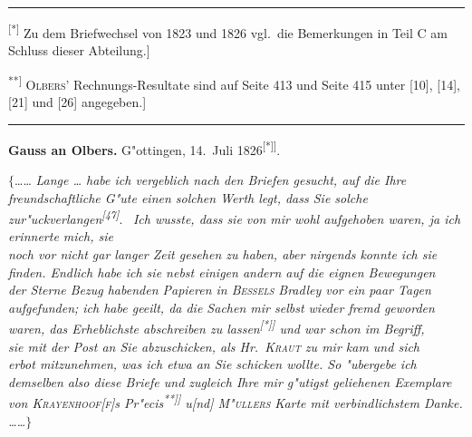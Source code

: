 \documentclass[12pt,a4paper]{article}
\theoremstyle{plain}
\theoremstyle{definition}
\theoremstyle{remark}
\begin{document}
\rule{\textwidth}{0.4pt}
{\small
\textsuperscript{[*]} Zu dem Briefwechsel von 1823 und 1826 vgl.\ die Bemerkungen in Teil C am Schluss dieser Abteilung.]

\textsuperscript{**]} \textsc{Olbers}' Rechnungs-Resultate sind auf Seite 413 und Seite 415 unter [10], [14], [21] und [26] angegeben.]
}
\rule{\textwidth}{0.4pt}

\vspace{1em}
\begin{center}
\textbf{Gauss an Olbers.} \quad G"ottingen, 14.\ Juli 1826\textsuperscript{[*]]}.
\end{center}

\noindent
$\{$\ldots{}\ldots{} {\itshape Lange \ldots{} habe ich vergeblich nach den Briefen gesucht, auf die Ihre} \\ {\itshape freundschaftliche G"ute einen solchen Werth legt, dass Sie solche zur"uckverlangen\textsuperscript{[47]}}. \ {\itshape Ich wusste, dass sie von mir wohl aufgehoben waren, ja ich erinnerte mich, sie} \\ {\itshape noch vor nicht gar langer Zeit gesehen zu haben, aber nirgends konnte ich sie} \\ {\itshape finden. Endlich habe ich sie nebst einigen andern auf die eignen Bewegungen} \\ {\itshape der Sterne Bezug habenden Papieren in \textsc{Bessels} {\itshape Bradley} vor ein paar Tagen} \\ {\itshape aufgefunden; ich habe geeilt, da die Sachen mir selbst wieder fremd geworden} \\ {\itshape waren, das Erheblichste abschreiben zu lassen\textsuperscript{[*]]} und war schon im Begriff,} \\ {\itshape sie mit der Post an Sie abzuschicken, als Hr.\ \textsc{Kraut} zu mir kam und sich} \\ {\itshape erbot mitzunehmen, was ich etwa an Sie schicken wollte. So "ubergebe ich} \\ {\itshape demselben also diese Briefe und zugleich Ihre mir g"utigst geliehenen Exemplare} \\ {\itshape von \textsc{Krayenhoof[f]}s Pr"ecis\textsuperscript{**]]} u[nd] \textsc{M"ullers} Karte mit verbindlichstem Danke.} \\ {\itshape \ldots{}\ldots{}$\}$}
\end{document}
